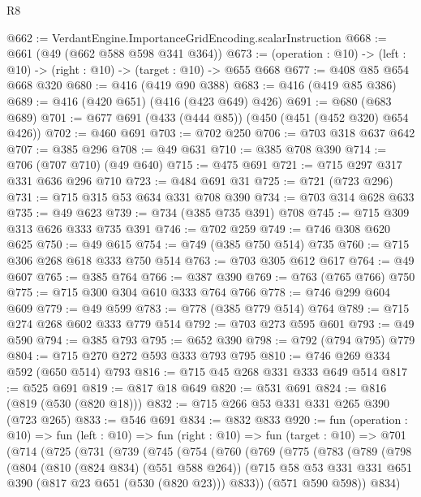 \begin{lexlean}{R8}
\begin{coremodule}
@662 := VerdantEngine.ImportanceGridEncoding.scalarInstruction
@668 := @661 (@49 (@662 @588 @598 @341 @364))
@673 := (operation : @10) -> (left : @10) -> (right : @10) -> (target : @10) -> @655 @668
@677 := @408 @85 @654 @668 @320
@680 := @416 (@419 @90 @388)
@683 := @416 (@419 @85 @386)
@689 := @416 (@420 @651) (@416 (@423 @649) @426)
@691 := @680 (@683 @689)
@701 := @677 @691 (@433 (@444 @85)) (@450 (@451 (@452 @320) @654 @426))
@702 := @460 @691
@703 := @702 @250
@706 := @703 @318 @637 @642
@707 := @385 @296
@708 := @49 @631
@710 := @385 @708 @390
@714 := @706 (@707 @710) (@49 @640)
@715 := @475 @691
@721 := @715 @297 @317 @331 @636 @296 @710
@723 := @484 @691 @31
@725 := @721 (@723 @296)
@731 := @715 @315 @53 @634 @331 @708 @390
@734 := @703 @314 @628 @633
@735 := @49 @623
@739 := @734 (@385 @735 @391) @708
@745 := @715 @309 @313 @626 @333 @735 @391
@746 := @702 @259
@749 := @746 @308 @620 @625
@750 := @49 @615
@754 := @749 (@385 @750 @514) @735
@760 := @715 @306 @268 @618 @333 @750 @514
@763 := @703 @305 @612 @617
@764 := @49 @607
@765 := @385 @764
@766 := @387 @390
@769 := @763 (@765 @766) @750
@775 := @715 @300 @304 @610 @333 @764 @766
@778 := @746 @299 @604 @609
@779 := @49 @599
@783 := @778 (@385 @779 @514) @764
@789 := @715 @274 @268 @602 @333 @779 @514
@792 := @703 @273 @595 @601
@793 := @49 @590
@794 := @385 @793
@795 := @652 @390
@798 := @792 (@794 @795) @779
@804 := @715 @270 @272 @593 @333 @793 @795
@810 := @746 @269 @334 @592 (@650 @514) @793
@816 := @715 @45 @268 @331 @333 @649 @514
@817 := @525 @691
@819 := @817 @18 @649
@820 := @531 @691
@824 := @816 (@819 (@530 (@820 @18)))
@832 := @715 @266 @53 @331 @331 @265 @390 (@723 @265)
@833 := @546 @691
@834 := @832 @833
@920 := fun (operation : @10) =>
  fun (left : @10) =>
  fun (right : @10) =>
  fun (target : @10) =>
  @701
    (@714
      (@725
        (@731
          (@739
            (@745
              (@754
                (@760
                  (@769
                    (@775
                      (@783
                        (@789
                          (@798
                            (@804
                              (@810 (@824 @834) (@551 @588 @264))
                              (@715
                                @58
                                @53
                                @331
                                @331
                                @651
                                @390
                                (@817 @23 @651 (@530 (@820 @23)))
                                @833))
                            (@571 @590 @598))
                          @834)

\end{coremodule}
\end{lexlean}
